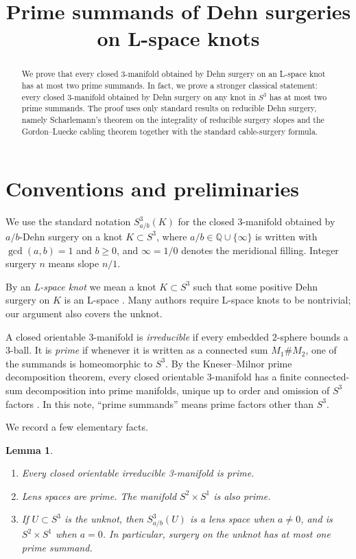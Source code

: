 \documentclass[11pt]{article}
\title{Prime summands of Dehn surgeries on L-space knots}
\author{}
\date{}
\theoremstyle{plain}
\newtheorem{lemma}[theorem]{Lemma}
\theoremstyle{definition}
\numberwithin{equation}{section}
\begin{document}
\maketitle

\begin{abstract}
We prove that every closed 3-manifold obtained by Dehn surgery on an L-space knot has at most two prime summands.  In fact, we prove a stronger classical statement: every closed 3-manifold obtained by Dehn surgery on any knot in $S^3$ has at most two prime summands.  The proof uses only standard results on reducible Dehn surgery, namely Scharlemann's theorem on the integrality of reducible surgery slopes and the Gordon--Luecke cabling theorem together with the standard cable-surgery formula.
\end{abstract}

\section{Conventions and preliminaries}

We use the standard notation $S^3_{a/b}(K)$ for the closed 3-manifold obtained by $a/b$-Dehn surgery on a knot $K\subset S^3$, where $a/b\in \mathbb Q\cup\{\infty\}$ is written with $\gcd(a,b)=1$ and $b\ge 0$, and $\infty=1/0$ denotes the meridional filling.  Integer surgery $n$ means slope $n/1$.

By an \emph{L-space knot} we mean a knot $K\subset S^3$ such that some positive Dehn surgery on $K$ is an L-space \cite{OSz}.  Many authors require L-space knots to be nontrivial; our argument also covers the unknot.

A closed orientable 3-manifold is \emph{irreducible} if every embedded $2$-sphere bounds a $3$-ball.  It is \emph{prime} if whenever it is written as a connected sum $M_1\# M_2$, one of the summands is homeomorphic to $S^3$.  By the Kneser--Milnor prime decomposition theorem, every closed orientable 3-manifold has a finite connected-sum decomposition into prime manifolds, unique up to order and omission of $S^3$ factors \cite{Hempel}.  In this note, ``prime summands'' means prime factors other than $S^3$.

We record a few elementary facts.

\begin{lemma}\label{lem:basic}
\begin{enumerate}
\item Every closed orientable irreducible 3-manifold is prime.
\item Lens spaces are prime.  The manifold $S^2\times S^1$ is also prime.
\item If $U\subset S^3$ is the unknot, then $S^3_{a/b}(U)$ is a lens space when $a\ne 0$, and is $S^2\times S^1$ when $a=0$.  In particular, surgery on the unknot has at most one prime summand.
\end{enumerate}
\end{lemma}
\end{document}
